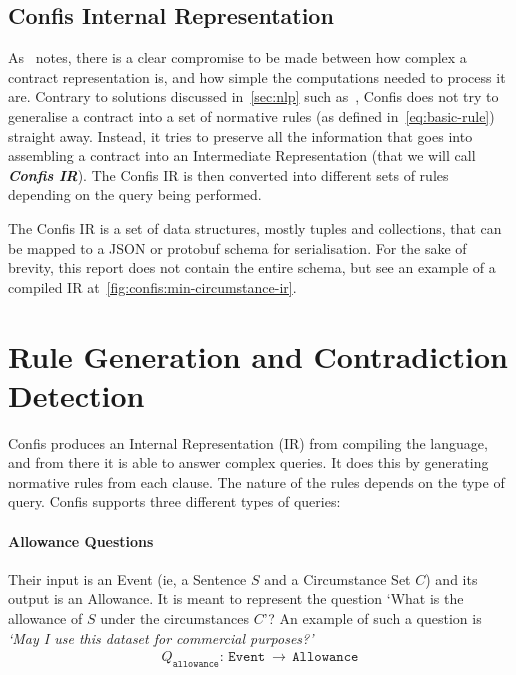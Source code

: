 \subsection{Confis Internal Representation}\label{subsec:confis-ir}
As~\cite{knottenbeltContractDriven} notes, there is a clear compromise to be made between how complex a contract representation is, and how simple the computations needed to process it are.
Contrary to solutions discussed in~\autoref{sec:nlp} such as~\cite{sleimi2018NLP4}, Confis does not try to generalise a contract into a set of normative rules (as defined in~\autoref{eq:basic-rule}) straight away.
Instead, it tries to preserve all the information that goes into assembling a contract into an Intermediate Representation (that we will call \textbf{\emph{Confis IR}}).
The Confis IR is then converted into different sets of rules depending on the query being performed.

The Confis IR is a set of data structures, mostly tuples and collections, that can be mapped to a JSON or protobuf schema for serialisation.
For the sake of brevity, this report does not contain the entire schema, but see an example of a compiled IR at~\autoref{fig:confis:min-circumstance-ir}.


\section{Rule Generation and Contradiction Detection}\label{sec:rule-generation}

Confis produces an Internal Representation (IR) from compiling the language, and from there it is able to answer complex queries.
It does this by generating normative rules from each clause.
The nature of the rules depends on the type of query.
Confis supports three different types of queries:

\paragraph{Allowance Questions} Their input is an Event (ie, a Sentence $S$ and a Circumstance Set $C$) and its output is an Allowance.
It is meant to represent the question `What is the allowance of $S$ under the circumstances $C$'?
An example of such a question is \emph{`May I use this dataset for commercial purposes?'}
\begin{gather}
    \nonumber
    Q_\texttt{allowance}: \, \texttt{Event}\ \to\, \texttt{Allowance}
\end{gather}

